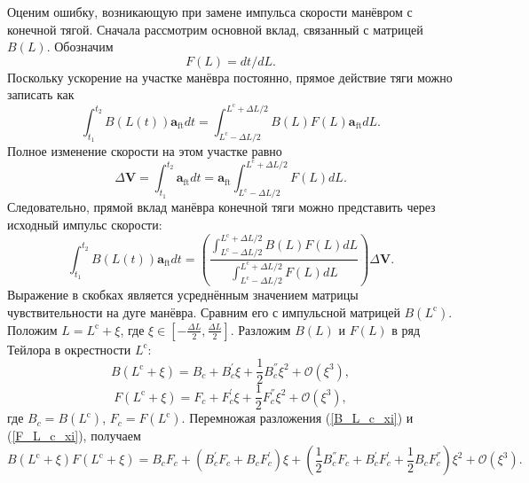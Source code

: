 Оценим ошибку, возникающую при замене импульса скорости манёвром с конечной тягой. Сначала рассмотрим основной вклад, связанный с матрицей $B(L)$. Обозначим 
\begin{equation}
    F(L) = dt / dL.
\end{equation}
Поскольку ускорение на участке манёвра постоянно, прямое действие тяги можно записать как
\begin{equation}
    \int_{t_1}^{t_2} B(L(t)) \mathbf{a}_{\text{ft}} dt = 
    \int_{L^\text{c} - \Delta L / 2}^{L^\text{c} + \Delta L / 2} B(L) F(L) \mathbf{a}_{\text{ft}} dL.
\end{equation}
Полное изменение скорости на этом участке равно
\begin{equation}
    \Delta \mathbf{V} = \int_{t_1}^{t_2} \mathbf{a}_{\text{ft}} dt = 
    \mathbf{a}_{\text{ft}} \int_{L^\text{c} - \Delta L / 2}^{L^\text{c} + \Delta L / 2} F(L) dL.
\end{equation}
Следовательно, прямой вклад манёвра конечной тяги можно представить через исходный импульс скорости:
\begin{equation}
    \int_{t_1}^{t_2} B(L(t)) \mathbf{a}_{\text{ft}} dt = 
    \left( \frac{\int_{L^\text{c} - \Delta L / 2}^{L^\text{c} + \Delta L / 2} B(L) F(L) dL}{\int_{L^\text{c} - \Delta L / 2}^{L^\text{c} + \Delta L / 2} F(L) dL} \right) \Delta \mathbf{V}.
\end{equation}
Выражение в скобках является усреднённым значением матрицы чувствительности на дуге манёвра. Сравним его с импульсной матрицей $B(L^\text{c})$. Положим $L = L^\text{c} + \xi$, где $\xi \in \left[ -\frac{\Delta L}{2}, \frac{\Delta L}{2} \right]$. Разложим $B(L)$ и $F(L)$ в ряд Тейлора в окрестности $L^\text{c}$:
\begin{equation}
    B(L^\text{c} + \xi) = B_c + B_c^{'} \xi + \frac{1}{2} B_c^{''} \xi^2 + \mathcal{O} (\xi^3),
\label{B_L_c_xi}
\end{equation}
\begin{equation}
    F(L^\text{c} + \xi) = F_c + F_c^{'} \xi + \frac{1}{2} F_c^{''} \xi^2 + \mathcal{O} (\xi^3),
\label{F_L_c_xi}
\end{equation}
где $B_c = B(L^\text{c})$, $F_c = F(L^\text{c})$. 
Перемножая разложения (\ref{B_L_c_xi}) и (\ref{F_L_c_xi}), получаем
\begin{equation}
    B(L^\text{c} + \xi) F(L^\text{c} + \xi) = B_c F_c + (B_c^{'} F_c + B_c F_c^{'}) \xi + 
    \left( \frac{1}{2} B_c^{''} F_c + B_c^{'} F_c^{'} + \frac{1}{2} B_c F_c^{''} \right) \xi^2 + \mathcal{O} (\xi^3).
\end{equation}

